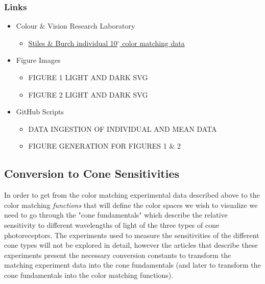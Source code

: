 \documentclass{article}
\begin{document}
\begin{multicols}{2}
\subsubsection{Links} %

\begin{itemize}
    \item Colour \& Vision Research Laboratory
    \begin{itemize}
        \item \href{http://www.cvrl.org/stilesburch10_ind.htm}{Stiles \& Burch individual 10$^\circ$ color matching data}
    \end{itemize}
    \item Figure Images
    \begin{itemize}
        \item FIGURE 1 LIGHT AND DARK SVG
        \item FIGURE 2 LIGHT AND DARK SVG
    \end{itemize}
    \item GitHub Scripts
    \begin{itemize}
        \item DATA INGESTION OF INDIVIDUAL AND MEAN DATA
        \item FIGURE GENERATION FOR FIGURES 1 \& 2
    \end{itemize}
\end{itemize}

\subsection{Conversion to Cone Sensitivities} %

In order to get from the color matching experimental data described above to the color matching \textit{functions} that will define the color spaces we wish to visualize we need to go through the "cone fundamentals" which describe the relative sensitivity to different wavelengths of light of the three types of cone photoreceptors.  The experiments used to measure the sensitivities of the different cone types will not be explored in detail, however the articles that describe these experiments present the necessary conversion constants to transform the matching experiment data into the cone fundamentals (and later to transform the cone fundamentals into the color matching functions).


\end{multicols}
\end{document}
